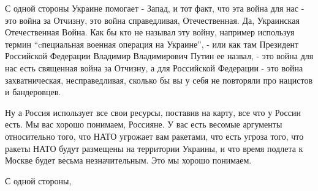 С одной стороны Украине помогает - Запад, и тот факт, что эта война для нас -
это война за Отчизну, это война справедливая, Отечественная. Да, Украинская
Отечественная Война. Как бы кто не называл эту войну, например используя термин
\enquote{cпециальная военная операция на Украине}, - или как там Президент
Российской Федерации Владимир Владимирович Путин ее назвал, - это война для нас
есть священная война за Отчизну, а для Российской Федерации - это война
захватническая, несправедливая, сколько бы вы у себя не повторяли про нацистов
и бандеровцев. 

Ну а Россия использует все свои ресурсы, поставив на карту, все что у России
есть.  Мы вас хорошо понимаем, Россияне. У вас есть весомые аргументы
относительно того, что НАТО угрожает вам ракетами, что есть угроза того, что
ракеты НАТО будут размещены на территории Украины, и что время подлета к Москве
будет весьма незначительным. Это мы хорошо понимаем. 

С одной стороны,
